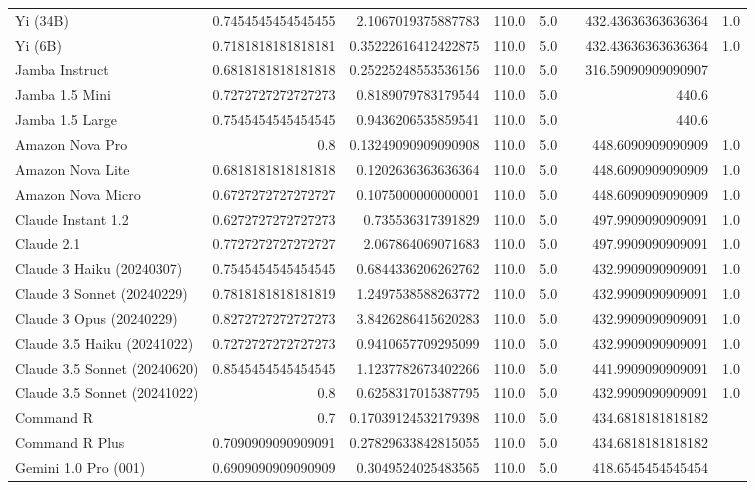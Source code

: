 \begin{table}[htp]
{\begin{tabular}{lrrrrrrr}
Yi (34B) & 0.7454545454545455 & 2.1067019375887783 & 110.0 & 5.0 &  & 432.43636363636364 & 1.0 \\
Yi (6B) & 0.7181818181818181 & 0.35222616412422875 & 110.0 & 5.0 &  & 432.43636363636364 & 1.0 \\
Jamba Instruct & 0.6818181818181818 & 0.25225248553536156 & 110.0 & 5.0 &  & 316.59090909090907 &  \\
Jamba 1.5 Mini & 0.7272727272727273 & 0.8189079783179544 & 110.0 & 5.0 &  & 440.6 &  \\
Jamba 1.5 Large & 0.7545454545454545 & 0.9436206535859541 & 110.0 & 5.0 &  & 440.6 &  \\
Amazon Nova Pro & 0.8 & 0.13249090909090908 & 110.0 & 5.0 &  & 448.6090909090909 & 1.0 \\
Amazon Nova Lite & 0.6818181818181818 & 0.1202636363636364 & 110.0 & 5.0 &  & 448.6090909090909 & 1.0 \\
Amazon Nova Micro & 0.6727272727272727 & 0.1075000000000001 & 110.0 & 5.0 &  & 448.6090909090909 & 1.0 \\
Claude Instant 1.2 & 0.6272727272727273 & 0.735536317391829 & 110.0 & 5.0 &  & 497.9909090909091 & 1.0 \\
Claude 2.1 & 0.7727272727272727 & 2.067864069071683 & 110.0 & 5.0 &  & 497.9909090909091 & 1.0 \\
Claude 3 Haiku (20240307) & 0.7545454545454545 & 0.6844336206262762 & 110.0 & 5.0 &  & 432.9909090909091 & 1.0 \\
Claude 3 Sonnet (20240229) & 0.7818181818181819 & 1.2497538588263772 & 110.0 & 5.0 &  & 432.9909090909091 & 1.0 \\
Claude 3 Opus (20240229) & 0.8272727272727273 & 3.8426286415620283 & 110.0 & 5.0 &  & 432.9909090909091 & 1.0 \\
Claude 3.5 Haiku (20241022) & 0.7272727272727273 & 0.9410657709295099 & 110.0 & 5.0 &  & 432.9909090909091 & 1.0 \\
Claude 3.5 Sonnet (20240620) & 0.8545454545454545 & 1.1237782673402266 & 110.0 & 5.0 &  & 441.9909090909091 & 1.0 \\
Claude 3.5 Sonnet (20241022) & 0.8 & 0.6258317015387795 & 110.0 & 5.0 &  & 432.9909090909091 & 1.0 \\
Command R & 0.7 & 0.17039124532179398 & 110.0 & 5.0 &  & 434.6818181818182 &  \\
Command R Plus & 0.7090909090909091 & 0.27829633842815055 & 110.0 & 5.0 &  & 434.6818181818182 &  \\
Gemini 1.0 Pro (001) & 0.6909090909090909 & 0.3049524025483565 & 110.0 & 5.0 &  & 418.6545454545454 &  \\

\end{tabular}}
\end{table}
